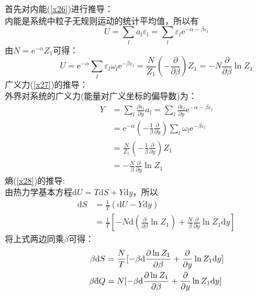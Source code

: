 \documentclass[12pt]{article}
\newcommand \dbar {{\; \bar{} \hspace{-0.3em} \mathrm d}}%
\begin{document}
\noindent
首先对内能(\ref{x26})进行推导：\\
内能是系统中粒子无规则运动的统计平均值，所以有
\begin{equation}
	U=\sum_l a_l \varepsilon_l =\sum_l \varepsilon_l \mathrm{e}^{-\alpha-\beta \varepsilon_l}
\end{equation}
由$N=\mathrm{e}^{-\alpha}Z_1$可得：
\begin{equation}
	U=\mathrm{e}^{-\alpha} \sum_{l} \varepsilon_l \omega_l \mathrm{e}^{-\beta \varepsilon_l}=\frac{N}{Z_1}(-\frac{\partial}{\partial \beta})Z_1=-N\frac{\partial}{\partial \beta}\ln Z_1
\end{equation}
广义力(\ref{x27})的推导：\\
外界对系统的广义力(能量对广义坐标的偏导数)为：
\begin{equation}
	\begin{split}
	Y&=\sum_{l}\frac{\partial \varepsilon_l}{\partial y}a_l=\sum_l \frac{\partial \varepsilon_l}{\partial y}\mathrm{e}^{-\alpha-\beta \varepsilon_l}\\
	&=\mathrm{e}^{-\alpha} (-\frac{1}{\beta} \frac{\partial}{\partial y}) \sum_{l} \omega_l \mathrm{e}^{-\beta\varepsilon_l}\\
	&=\frac{N}{Z_1}(-\frac{1}{\beta} \frac{\partial}{\partial y})Z_1\\
	&=-\frac{N}{\beta}\frac{\partial}{\partial y}\ln Z_1
	\end{split}
\end{equation}
熵(\ref{x28})的推导:\\
由热力学基本方程$\mathrm{d}U=T\mathrm{d}S+Y\mathrm{d}y$，所以
\begin{equation}
\begin{split}
	\mathrm{d}S&=\frac{1}{T}(\mathrm{d}U-Y\mathrm{d}y)\\
	&=\frac{1}{T}[-N\mathrm{d}(\frac{\partial }{\partial \beta}\ln Z_1)+\frac{N}{\beta} \frac{\partial}{\partial y} \ln Z_1 \mathrm{d}y]
\end{split}
\end{equation}
 将上式两边同乘$\beta$可得：
\begin{equation}
	\begin{split}
		\beta \mathrm{d}S&=\frac{N}{T}[-\beta\mathrm{d}\frac{\partial \ln Z_1}{\partial \beta}+\frac{\partial}{\partial y}\ln Z_1\mathrm{d}y]
		\\
		\beta \dbar Q&=N[-\beta\mathrm{d}\frac{\partial \ln Z_1}{\partial \beta}+\frac{\partial}{\partial y}\ln Z_1\mathrm{d}y]
		\label{x29}
		\end{split}
\end{equation}
\end{document}
